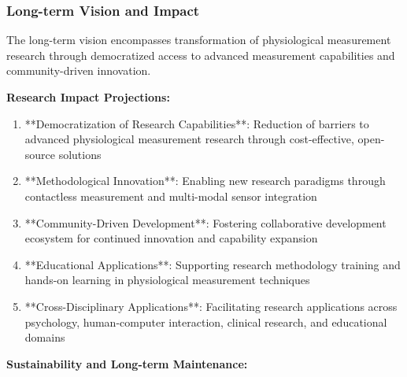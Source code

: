 \documentclass[12pt,a4paper]{article}
\begin{document}
\subsubsection{Long-term Vision and Impact}

The long-term vision encompasses transformation of physiological measurement research through democratized access to
advanced measurement capabilities and community-driven innovation.

\textbf{Research Impact Projections:}

\begin{enumerate}
\item **Democratization of Research Capabilities**: Reduction of barriers to advanced physiological measurement research
   through cost-effective, open-source solutions
\item **Methodological Innovation**: Enabling new research paradigms through contactless measurement and multi-modal sensor
   integration
\item **Community-Driven Development**: Fostering collaborative development ecosystem for continued innovation and
   capability expansion
\item **Educational Applications**: Supporting research methodology training and hands-on learning in physiological
   measurement techniques
\item **Cross-Disciplinary Applications**: Facilitating research applications across psychology, human-computer
   interaction, clinical research, and educational domains

\end{enumerate}
\textbf{Sustainability and Long-term Maintenance:}
\end{document}
